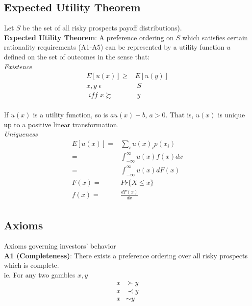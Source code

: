 \documentclass[
14pt,notheorems,hyperref={pdfauthor=whatever}
]{beamer}
\begin{document}
\subsection{Expected Utility Theorem}

\begin{frame}
Let $S$ be the set of all risky prospects  payoff distributions).\\
\hfill \break
\underline{\textbf{Expected Utility Theorem}}: A preference ordering on $S$ which satisfies certain rationality requirements (A1-A5) can be represented by a utility function $u$ defined on the set of outcomes in the sense that:\\
\hfill \break
\textit{Existence}
\begin{align*}
    E[u(x)] \geq& E[u(y)]\\
    x, y \; \epsilon& \; S\\
    \textit{ iff } x \succsim & \; y\\
\end{align*}
\end{frame}

\begin{frame}
If $u(x)$ is a utility function, so is $au(x)+b\textit{, }a>0$. That is, $u(x)$ is unique up to a positive linear transformation. \\
\hfill \break
\textit{Uniqueness}
\begin{align*}
    E[u(x)] =& \sum_i u(x)_i p(x_i)\\
    =& \int_{-\infty}^\infty u(x)f(x)dx\\
    =& \int_{-\infty}^\infty u(x)dF(x)\\
    F(x) =& Pr\{X \leq x\}\\
    f(x) =& \frac{dF(x)}{dx}\\
\end{align*}
\end{frame}

\subsection{Axioms}

\begin{frame}
Axioms governing investors' behavior\\
\hfill \break
\textbf{A1 (Completeness)}: There exists a preference ordering over all risky prospects which is complete.\\
\hfill \break
ie. For any two gambles $x,y$
\hfill \break
\begin{align*}
    x &\succ y\\
    x &\prec y\\
    x &\sim y\\
\end{align*}
\end{frame}
\end{document}
